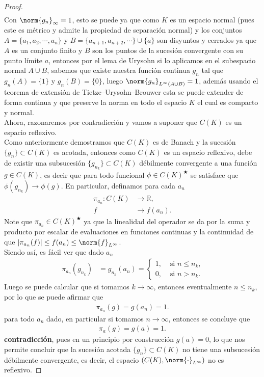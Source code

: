 \begin{proof}
\begin{align*}
  \end{align*}
  Con $\norm{g_{n}}_{\infty}=1$, esto se puede ya que como $K$ es un espacio normal (pues este es métrico y admite la propiedad de separación normal) y los conjuntos $A=\{a_{1},a_{2},\cdots,a_{n}\}$ y $B=\{a_{n+1},a_{n+2},\cdots\}\cup \{a\}$ son disyuntos y cerrados ya que $A$ es un conjunto finito y $B$ son los puntos de la sucesión convergente con su punto límite $a$, entonces por el lema de Urysohn si lo aplicamos en el subespacio normal $A\cup B$, sabemos que existe nuestra función continua $g_{n}$ tal que $g_{n}(A)=\{1\}$ y $g_{n}(B)=\{0\}$, luego $\norm{g_{n}}_{L^{\infty}(A\cup B)}=1$, además usando el teorema de extensión de Tietze–Urysohn–Brouwer esta se puede extender de forma continua y que preserve la norma en todo el espacio $K$ el cual es compacto y normal.\\
  Ahora, razonaremos por contradicción y vamos a suponer que $C(K)$ es un espacio reflexivo.\\
  Como anteriormente demostramos que $C(K)$ es de Banach y la sucesión $\{g_{n}\}\subset C(K)$ es acotada, entonces como $C(K)$ es un espacio reflexivo, debe de existir una subsucesión $\{g_{n_{k}}\}\subset C(K)$ débilmente convergente a una función $g\in C(K)$, es decir que para todo funcional $\phi\in C(K)^\bigstar$ se satisface que $\phi(g_{n_{k}})\to\phi(g)$. En particular, definamos para cada $a_{n}$
  \begin{align*}
    \pi_{a_{n}}:C(K)&\to \mathbb{R},\\
    f&\to f(a_{n}).
  \end{align*}
  Note que $\pi_{a_{n}}\in C(K)^\bigstar$ ya que la linealidad del operador se da por la suma y producto por escalar de evaluaciones en funciones continuas y la continuidad de que $|\pi_{a_{n}}(f)|\leq f(a_{n})\leq \norm{f}_{L^{\infty}}$.\\
  Siendo así, es fácil ver que dado $a_{n}$
  \begin{align*}
    \pi_{a_{n}}(g_{n_{k}})&=g_{n_{k}}(a_{n})= 
    \begin{cases}
      1, &\text{ si } n\leq n_{k} \text{,} \\
      0, &\text{ si } n>n_{k}.
    \end{cases}
  \end{align*}
  Luego se puede calcular que si tomamos $k\to \infty$, entonces eventualmente $n\leq n_{k}$, por lo que se puede afirmar que
  \begin{align*}
    \pi_{a_{n}}(g)=g(a_{n})=1. 
  \end{align*}
  para todo $a_{n}$ dado, en particular si tomamos $n\to\infty$, entonces se concluye que
  \begin{align*}
    \pi_{a}(g)=g(a)=1.
  \end{align*}
  \textbf{contradicción}, pues en un principio por construcción $g(a)=0$, lo que nos permite concluir que la sucesión acotada $\{g_{n}\}\subset C(K)$ no tiene una subsucesión débilmente convergente, es decir, el espacio $(C(K),\norm{\cdot}_{L^{\infty}})$ no es reflexivo. 
\end{proof}

